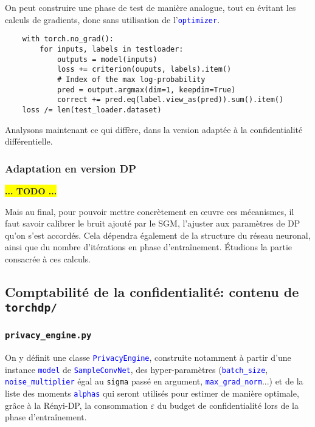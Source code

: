 \documentclass[a4paper,11pt]{article} %
\newcommand{\ttt}[1]{\texttt{#1}}
\newcommand{\code}[1]{\textcolor{blue}{\texttt{#1}}}
\newcommand{\rem}[1]{\colorbox{yellow}{\textbf{#1}}}
\begin{document}
On peut construire une phase de test de manière analogue, tout en évitant les calculs de gradients, donc sans utilisation de l'\code{optimizer}.
    \begin{verbatim}
    with torch.no_grad():
        for inputs, labels in testloader:
            outputs = model(inputs)
            loss += criterion(ouputs, labels).item()
            # Index of the max log-probability
            pred = output.argmax(dim=1, keepdim=True)
            correct += pred.eq(label.view_as(pred)).sum().item()
    loss /= len(test_loader.dataset)
    \end{verbatim}

Analysons maintenant ce qui diffère, dans la version adaptée à la confidentialité différentielle.
%
\subsubsection{Adaptation en version DP}
\rem{... TODO ...}

Mais au final, pour pouvoir mettre concrètement en œuvre ces mécanismes, il faut savoir calibrer le bruit ajouté par le SGM, l'ajuster aux paramètres de DP qu'on s'est accordés. Cela dépendra également de la structure du réseau neuronal, ainsi que du nombre d'itérations en phase d'entraînement. Étudions la partie consacrée à ces calculs.
%
\subsection{Comptabilité de la confidentialité: contenu de \ttt{torchdp/}}
%
\subsubsection{\ttt{privacy\_engine.py}}
%
On y définit une classe \code{PrivacyEngine}, construite notamment à partir d'une instance \code{model} de \code{SampleConvNet}, des hyper-paramètres (\code{batch\_size}, \code{noise\_multiplier} égal au \ttt{sigma} passé en argument, \code{max\_grad\_norm}...) et de la liste des moments \code{alphas} qui seront utilisés pour estimer de manière optimale, grâce à la Rényi-DP, la consommation $\varepsilon$ du budget de confidentialité lors de la phase d'entraînement.
\end{document}
